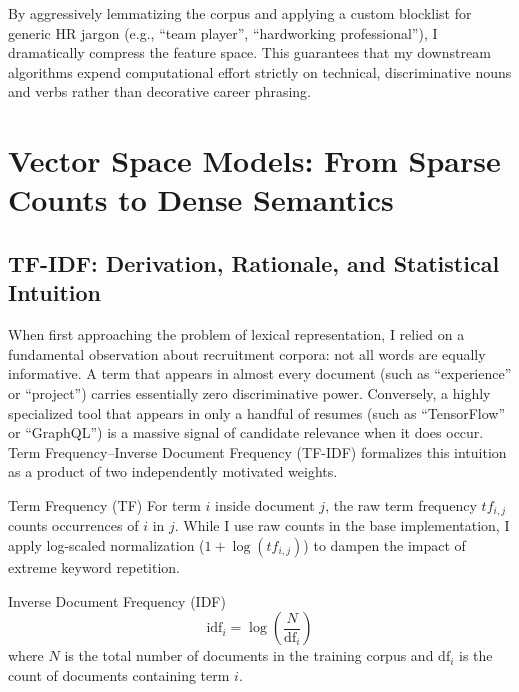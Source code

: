 \vspace{0.5em}

By aggressively lemmatizing the corpus and applying a custom blocklist for generic HR jargon (e.g., ``team player'', ``hardworking professional''), I dramatically compress the feature space. This guarantees that my downstream algorithms expend computational effort strictly on technical, discriminative nouns and verbs rather than decorative career phrasing.

\section{Vector Space Models: From Sparse Counts to Dense Semantics}
\label{sec:vsm}

\subsection{TF-IDF: Derivation, Rationale, and Statistical Intuition}

When first approaching the problem of lexical representation, I relied on a fundamental observation about recruitment corpora: not all words are equally informative. A term that appears in almost every document (such as ``experience'' or ``project'') carries essentially zero discriminative power. Conversely, a highly specialized tool that appears in only a handful of resumes (such as ``TensorFlow'' or ``GraphQL'') is a massive signal of candidate relevance when it does occur. Term Frequency--Inverse Document Frequency (TF-IDF) formalizes this intuition as a product of two independently motivated weights.

\begin{definitionbox}{Term Frequency (TF)}
For term $i$ inside document $j$, the raw term frequency $tf_{i,j}$ counts occurrences of $i$ in $j$. While I use raw counts in the base implementation, I apply log-scaled normalization ($1 + \log(tf_{i,j})$) to dampen the impact of extreme keyword repetition.
\end{definitionbox}

\vspace{0.5em}

\begin{definitionbox}{Inverse Document Frequency (IDF)}
\begin{equation}
\text{idf}_i = \log\!\left(\frac{N}{\text{df}_i}\right)
\label{eq:idf}
\end{equation}
where $N$ is the total number of documents in the training corpus and $\text{df}_i$ is the count of documents containing term $i$.
\end{definitionbox}

